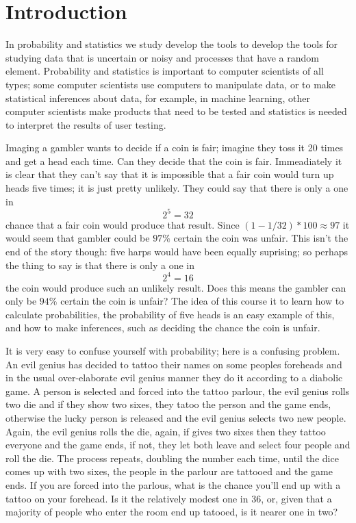 \documentclass[11pt,a4paper]{scrartcl}
\begin{document}
\section*{Introduction}

In probability and statistics we study develop the tools to develop
the tools for studying data that is uncertain or noisy and processes
that have a random element. Probability and statistics is important to
computer scientists of all types; some computer scientists use
computers to manipulate data, or to make statistical inferences about
data, for example, in machine learning, other computer scientists make
products that need to be tested and statistics is needed to interpret
the results of user testing.

Imaging a gambler wants to decide if a coin is fair; imagine they toss
it 20 times and get a head each time. Can they decide that the coin is
fair. Immeadiately it is clear that they can't say that it is
impossible that a fair coin would turn up heads five times; it is just
pretty unlikely. They could say that there is only a one in
\begin{equation}
2^{5}=32
\end{equation}
chance that a fair coin would produce that result. Since
$(1-1/32)*100\approx 97$ it would seem that gambler could be $97\%$
certain the coin was unfair. This isn't the end of the story though:
five harps would have been equally suprising; so perhaps the thing to
say is that there is only a one in
\begin{equation}
2^{4}=16
\end{equation}
the coin would produce such an unlikely result. Does this means the
gambler can only be $94\%$ certain the coin is unfair? The idea of
this course it to learn how to calculate probabilities, the
probability of five heads is an easy example of this, and how to make
inferences, such as deciding the chance the coin is unfair.


It is very easy to confuse yourself with probability; here is a
confusing problem. An evil genius has decided to tattoo their names on
some peoples foreheads and in the usual over-elaborate evil genius
manner they do it according to a diabolic game. A person is selected
and forced into the tattoo parlour, the evil genius rolls two die and
if they show two sixes, they tatoo the person and the game ends,
otherwise the lucky person is released and the evil genius selects two
new people. Again, the evil genius rolls the die, again, if gives two
sixes then they tattoo everyone and the game ends, if not, they let
both leave and select four people and roll the die. The process
repeats, doubling the number each time, until the dice comes up with
two sixes, the people in the parlour are tattooed and the game ends. If you are
forced into the parlous, what is the chance you'll end up with a tattoo
on your forehead. Is it the relatively modest one in 36, or, given
that a majority of people who enter the room end up tatooed, is it
nearer one in two?
\end{document}
